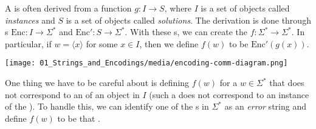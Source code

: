 \begin{important} \label{important:Computational-problem-as-mapping-instances-to-solutions}
A  is often derived from a function $g: I \to S$, where $I$ is a set of objects called \emph{instances} and $S$ is a set of objects called \emph{solutions}. 
The derivation is done through s $\text{Enc}: I \to \Sigma^*$ and $\text{Enc}': S \to \Sigma^*$. 
With these s, we can create the  $f : \Sigma^* \to \Sigma^*$. 
In particular, if $w = \langle x \rangle$ for some $x \in I$, then we define $f(w)$ to be $\text{Enc}'(g(x))$.

\begin{center}
\texttt{[image: 01\_Strings\_and\_Encodings/media/encoding-comm-diagram.png]}
\end{center}

One thing we have to be careful about is defining $f(w)$ for a  $w \in \Sigma^*$ that does not correspond to an  of an object in $I$ (such a  does not correspond to an instance of the ). 
To handle this, we can identify one of the s in $\Sigma^*$ as an \emph{error} string and define $f(w)$ to be that .
\end{important}


